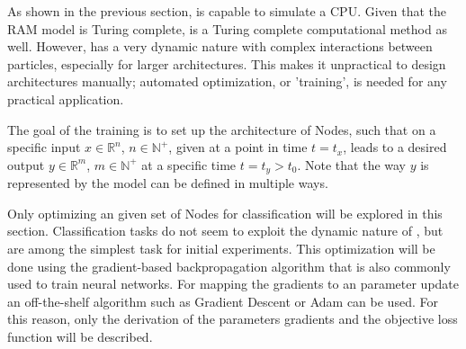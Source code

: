 As shown in the previous section, \nenwin is capable to simulate a CPU. Given that the RAM model is Turing complete, \nenwin is a Turing complete computational method as well. However, \nenwin has a very dynamic nature with complex interactions between particles, especially for larger architectures. This makes it unpractical to design architectures manually; automated optimization, or 'training', is needed for any practical application. 

The goal of the training is to set up the architecture of Nodes, 
such that on a specific input $x \in \mathbb{R}^n$, $n \in \mathbb{N^+}$, 
given at a point in time $t = t_x$, 
leads to a desired output $y \in \mathbb{R}^m$, 
$m \in \mathbb{N^+}$ at a specific time $t = t_y > t_0$. 
Note that the way $y$ is represented by the \nenwin model can be defined in multiple ways.

Only optimizing an given set of Nodes for classification will be explored in this section\footnotemark.
Classification tasks do not seem to exploit the dynamic nature of \nenwin, 
but are among the simplest task for initial experiments.
This optimization will be done using the gradient-based backpropagation algorithm that is also commonly used to train neural networks.
For mapping the gradients to an parameter update an off-the-shelf algorithm such as Gradient Descent or Adam \cite{adam} can be used.
For this reason, only the derivation of the parameters gradients and the objective loss function will be described.

